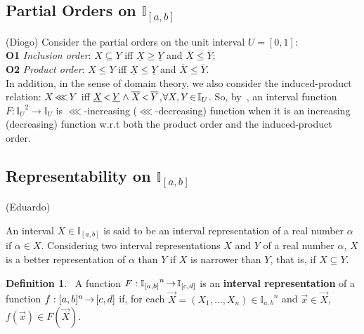 \documentclass[12pt]{article}
\theoremstyle{plain}
\theoremstyle{remark}
\theoremstyle{definition}
\newtheorem{definition}[theorem]{Definition}
\theoremstyle{proposition}
\newcommand{\lra}{\hspace{-0.05cm}\rightarrow\hspace{-0.05cm}}
\newcommand{\II}{\mathbb{I} }
\begin{document}
\subsection{Partial Orders on $\mathbb{I}_{[a,b]}$} (Diogo)
Consider the partial orders on the unit interval $U=[0,1]$:\\
\indent \textbf{O1} \emph{Inclusion order}: $X\subseteq Y$ iff
$\underline{X}\geq \underline{Y}$ and $\overline{X}\leq
\overline{Y}$;\\
%
\indent \textbf{O2} \emph{Product order}: $X\leq Y$ iff $\underline{X}\leq
\underline{Y}$ and $\overline{X}\leq \overline{Y}$.\\
%
\indent In addition, in the sense of domain theory, we also consider the induced-product relation: $X\hspace{-0.05cm}\lll\hspace{-0.05cm}Y$ iff $\underline{X}\hspace{-0.05cm}<\hspace{-0.05cm}\underline{Y} \wedge \overline{X}\hspace{-0.05cm}<\hspace{-0.05cm}\overline{Y}$,$\forall X,Y\hspace{-0.05cm}\in\hspace{-0.05cm}\II_U$.
So, by~\cite[Def.~1]{BDSR11}, an interval function $F:{\II_U}^2 \rightarrow \II_U$ is $\lll$-increasing ($\lll$-decreasing) function  when it is an increasing (decreasing) function w.r.t both the product order and the induced-product order.

\subsection{Representability on $\mathbb{I}_{[a,b]}$} (Eduardo) 

An interval $X \in \II_{[a,b]}$ is said to be an interval representation of a real number $\alpha$ if $\alpha \in X$.
Considering two interval representations $X$ and $Y$ of a real number $\alpha$,  $X$ is a better representation of
$\alpha$ than $Y$ if $X$ is narrower than $Y$, that is,  if $X\subseteq Y$.

\begin{definition}~\cite[Section 1]{SBA06}\label{d1} A function $F:{\mathbb{I}_{[a,b]}}^n\lra \mathbb{I}_{[c,d]}$ is an \textbf{interval
representation} of a function $f:[a,b]^n\lra [c,d]$ if, for each
$\vec{X}= (X_1, \ldots, X_n)\in {\mathbb{I}_{a,b}}^n$ and $\vec{x}\in \vec{X}$, $f(\vec{x})\in
F(\vec{X})$.
\end{definition}
\end{document}
